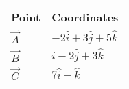 \begin{tabular}{|m{5em}|m{10em}|}
    \hline
    \textbf{Point} &\textbf{Coordinates} \\
    \hline
         $\vec{A}$ & $-2\hat{i}+3\hat{j}+5\hat{k}$  \\
    \hline
        $\vec{B}$ & $\hat{i}+2\hat{j}+3\hat{k}$ \\
    \hline
        $\vec{C}$ & $7\hat{i}-\hat{k}$ \\
    \hline
\end{tabular}